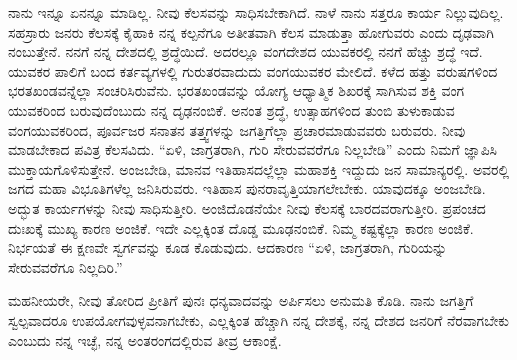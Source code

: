 ನಾನು ಇನ್ನೂ ಏನನ್ನೂ ಮಾಡಿಲ್ಲ. ನೀವು ಕೆಲಸವನ್ನು ಸಾಧಿಸಬೇಕಾಗಿದೆ. ನಾಳೆ ನಾನು ಸತ್ತರೂ ಕಾರ್ಯ ನಿಲ್ಲುವುದಿಲ್ಲ. ಸಹಸ್ರಾರು ಜನರು ಕೆಲಸಕ್ಕೆ ಕೈಹಾಕಿ ನನ್ನ ಕಲ್ಪನೆಗೂ ಅತೀತವಾಗಿ ಕೆಲಸ ಮಾಡುತ್ತಾ ಹೋಗುವರು ಎಂದು ದೃಢವಾಗಿ ನಂಬುತ್ತೇನೆ. ನನಗೆ ನನ್ನ ದೇಶದಲ್ಲಿ ಶ್ರದ್ಧೆಯಿದೆ. ಅದರಲ್ಲೂ ವಂಗದೇಶದ ಯುವಕರಲ್ಲಿ ನನಗೆ ಹೆಚ್ಚು ಶ್ರದ್ಧೆ ಇದೆ. ಯುವಕರ ಪಾಲಿಗೆ ಬಂದ ಕರ್ತವ್ಯಗಳಲ್ಲಿ ಗುರುತರವಾದುದು ವಂಗಯುವಕರ ಮೇಲಿದೆ. ಕಳೆದ ಹತ್ತು ವರುಷಗಳಿಂದ ಭರತಖಂಡವನ್ನೆಲ್ಲಾ ಸಂಚರಿಸಿರುವೆನು. ಭರತಖಂಡವನ್ನು ಯೋಗ್ಯ ಆಧ್ಯಾತ್ಮಿಕ ಶಿಖರಕ್ಕೆ ಸಾಗಿಸುವ ಶಕ್ತಿ ವಂಗ ಯುವಕರಿಂದ ಬರುವುದೆಂಬುದು ನನ್ನ ದೃಢನಂಬಿಕೆ. ಅನಂತ ಶ್ರದ್ಧೆ, ಉತ್ಸಾಹಗಳಿಂದ ತುಂಬಿ ತುಳುಕಾಡುವ ವಂಗಯುವಕರಿಂದ, ಪೂರ್ವಜರ ಸನಾತನ ತತ್ತ್ವಗಳನ್ನು ಜಗತ್ತಿಗೆಲ್ಲಾ ಪ್ರಚಾರಮಾಡುವವರು ಬರುವರು. ನೀವು ಮಾಡಬೇಕಾದ ಪವಿತ್ರ ಕೆಲಸವಿದು. “ಏಳಿ, ಜಾಗ್ರತರಾಗಿ, ಗುರಿ ಸೇರುವವರೆಗೂ ನಿಲ್ಲಬೇಡಿ” ಎಂದು ನಿಮಗೆ ಜ್ಞಾಪಿಸಿ ಮುಕ್ತಾಯಗೊಳಿಸುತ್ತೇನೆ. ಅಂಜಬೇಡಿ, ಮಾನವ ಇತಿಹಾಸದಲ್ಲೆಲ್ಲಾ ಮಹಾಶಕ್ತಿ ಇದ್ದುದು ಜನ ಸಾಮಾನ್ಯರಲ್ಲಿ. ಅವರಲ್ಲಿ ಜಗದ ಮಹಾ ವಿಭೂತಿಗಳೆಲ್ಲ ಜನಿಸಿರುವರು. ಇತಿಹಾಸ ಪುನರಾವೃತ್ತಿಯಾಗಲೇಬೇಕು. ಯಾವುದಕ್ಕೂ ಅಂಜಬೇಡಿ. ಅದ್ಭುತ ಕಾರ್ಯಗಳನ್ನು ನೀವು ಸಾಧಿಸುತ್ತೀರಿ. ಅಂಜಿದೊಡನೆಯೇ ನೀವು ಕೆಲಸಕ್ಕೆ ಬಾರದವರಾಗುತ್ತೀರಿ. ಪ್ರಪಂಚದ ದುಃಖಕ್ಕೆ ಮುಖ್ಯ ಕಾರಣ ಅಂಜಿಕೆ. ಇದೇ ಎಲ್ಲಕ್ಕಿಂತ ದೊಡ್ಡ ಮೂಢನಂಬಿಕೆ. ನಿಮ್ಮ ಕಷ್ಟಕ್ಕೆಲ್ಲಾ ಕಾರಣ ಅಂಜಿಕೆ. ನಿರ್ಭಯತೆ ಈ ಕ್ಷಣವೇ ಸ್ವರ್ಗವನ್ನು ಕೂಡ ಕೊಡುವುದು. ಆದಕಾರಣ “ಏಳಿ, ಜಾಗ್ರತರಾಗಿ, ಗುರಿಯನ್ನು ಸೇರುವವರೆಗೂ ನಿಲ್ಲದಿರಿ.”

ಮಹನೀಯರೇ, ನೀವು ತೋರಿದ ಪ್ರೀತಿಗೆ ಪುನಃ ಧನ್ಯವಾದವನ್ನು ಅರ್ಪಿಸಲು ಅನುಮತಿ ಕೊಡಿ. ನಾನು ಜಗತ್ತಿಗೆ ಸ್ವಲ್ಪವಾದರೂ ಉಪಯೋಗವುಳ್ಳವನಾಗಬೇಕು, ಎಲ್ಲಕ್ಕಿಂತ ಹೆಚ್ಚಾಗಿ ನನ್ನ ದೇಶಕ್ಕೆ, ನನ್ನ ದೇಶದ ಜನರಿಗೆ ನೆರವಾಗಬೇಕು ಎಂಬುದು ನನ್ನ ಇಚ್ಛೆ, ನನ್ನ ಅಂತರಂಗದಲ್ಲಿರುವ ತೀವ್ರ ಆಕಾಂಕ್ಷೆ.

